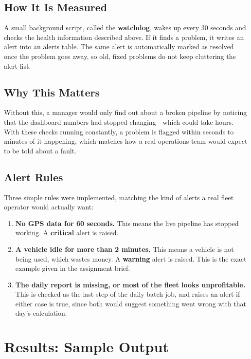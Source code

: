 \documentclass[12pt,a4paper]{article}
\begin{document}
\subsection{How It Is Measured}

A small background script, called the \textbf{watchdog}, wakes up every
30 seconds and checks the health information described above. If it finds a
problem, it writes an alert into an alerts table. The same alert is
automatically marked as resolved once the problem goes away, so old,
fixed problems do not keep cluttering the alert list.

\subsection{Why This Matters}

Without this, a manager would only find out about a broken pipeline by
noticing that the dashboard numbers had stopped changing - which could
take hours. With these checks running constantly, a problem is flagged
within seconds to minutes of it happening, which matches how a real
operations team would expect to be told about a fault.

\subsection{Alert Rules}

Three simple rules were implemented, matching the kind of alerts a real
fleet operator would actually want:

\begin{enumerate}
  \item \textbf{No GPS data for 60 seconds.} This means the live pipeline
    has stopped working. A \textbf{critical} alert is raised.
  \item \textbf{A vehicle idle for more than 2 minutes.} This means a
    vehicle is not being used, which wastes money. A \textbf{warning}
    alert is raised. This is the exact example given in the assignment
    brief.
  \item \textbf{The daily report is missing, or most of the fleet looks
    unprofitable.} This is checked as the last step of the daily batch job,
    and raises an alert if either case is true, since both would suggest
    something went wrong with that day's calculation.
\end{enumerate}

\section{Results: Sample Output}
\end{document}

